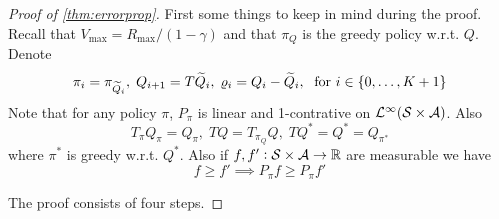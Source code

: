 \begin{proof}[Proof of \cref{thm:errorprop}] 
  First some things to keep in mind during the proof.
  Recall that $V_{\max} = R_{\max} / (1 - \gamma)$ and that
  $\pi_Q$ is the greedy policy w.r.t. $Q$.
  Denote 
  \[ \pi_i = \pi_{\widetilde{Q}_i},
    \; Q_{i+1} = T \widetilde{Q}_{i},
  \; \varrho_{i} = Q_{i} - \widetilde{Q}_{i},
\; \mbox{ for } i \in \{0,\dots,K+1\} \]
  Note that for any policy $\pi$,
  $P_{\pi}$ is linear and 1-contrative on
  $\mathcal{L}^\infty(\mathcal{S} \times \mathcal{A})$. %
  Also \[ T_{\pi} Q_{\pi} = Q_{\pi}, \;
    T Q = T_{\pi_Q} Q, \;
  T Q^* = Q^* = Q_{\pi^*} \]
  where $\pi^*$ is greedy w.r.t. $Q^*$. 
  Also if $f,f':\mathcal{S}\times \mathcal{A} \to \mathbb{R}$ are measurable we have
  \begin{equation}
    f \geq f' \implies P_{\pi} f \geq P_{\pi} f'
    \label{eq:Pmonotone}
  \end{equation}
  
  The proof consists of four steps.


\end{proof}
